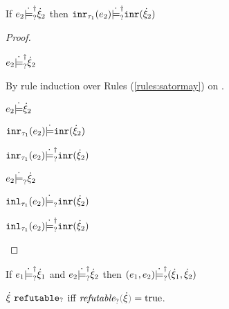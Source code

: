 \begin{lemma}
  \label{lem:satormay-inr}
  If $e_2 \dot{\models}_{?}^{\dag} \dot{\xi}_2$ then $\mathtt{inr}_{\tau_1}({e_2}) \dot{\models}_{?}^{\dag} \mathtt{inr}(\dot{\xi}_2)$
\end{lemma}
\begin{proof}
  \begin{pfsteps*}
  \item $e_2 \dot{\models}_{?}^{\dag} \dot{\xi}_2$  
  \end{pfsteps*}
  By rule induction over Rules (\ref{rules:satormay}) on .
  \begin{byCases}

  \item[\text{(\ref{rule:CSMSSat})}]
    \begin{pfsteps*}
    \item $e_2 \dot{\models} \dot{\xi}_2$  
    \item $\mathtt{inr}_{\tau_1}({e_2}) \dot{\models} \mathtt{inr}(\dot{\xi}_2)$  
    \item $\mathtt{inr}_{\tau_1}({e_2}) \dot{\models}_{?}^{\dag} \mathtt{inr}(\dot{\xi}_2)$ 
    \end{pfsteps*}

  \item[\text{(\ref{rule:CSMSMay})}]
    \begin{pfsteps*}
    \item $e_2 \dot{\models}_{?} \dot{\xi}_2$  
    \item $\mathtt{inl}_{\tau_1}({e_2}) \dot{\models}_{?} \mathtt{inr}(\dot{\xi}_2)$  
    \item $\mathtt{inl}_{\tau_1}({e_2}) \dot{\models}_{?}^{\dag} \mathtt{inr}(\dot{\xi}_2)$ 
    \end{pfsteps*}
  \end{byCases}
  \resetpfcounter
\end{proof}

\begin{lemma}
  \label{lem:satormay-pair}
  If $e_1 \dot{\models}_{?}^{\dag} \dot{\xi}_1$ and $e_2 \dot{\models}_{?}^{\dag} \dot{\xi}_2$ then $(e_1 , e_2) \dot{\models}_{?}^{\dag} (\dot{\xi}_1 , \dot{\xi}_2)$
\end{lemma}

\begin{lemma}
  \label{lem:sound-complete-xi-refutable}
  $\dot{\xi} ~\mathtt{refutable}_?$ iff $\frefutable{\hxi} = \true$.
\end{lemma}

